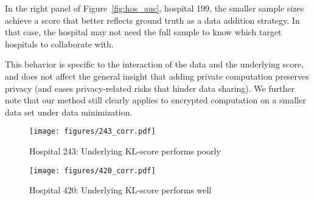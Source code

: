 In the right panel of Figure~\ref{fig:hos_auc}, hospital 199, the smaller sample sizes achieve a score that better reflects ground truth as a data addition strategy. In that case, the hospital may not need the full sample to know which target hospitals to collaborate with. 

This behavior is specific to the interaction of the data and the underlying score, and does not affect the general insight that adding private computation preserves privacy (and eases privacy-related risks that hinder data sharing). We further note that our method still clearly applies to encrypted computation on a smaller data set under data minimization.


\begin{figure}[h]
\begin{minipage}[t]{0.48\textwidth}
  \centering
  \texttt{[image: figures/243\_corr.pdf]}
  \caption{Hospital 243: Underlying KL-score performs poorly}
  \label{fig:corr_poor}
\end{minipage}
\hfill
\begin{minipage}[t]{0.48\textwidth}
  \centering
  \texttt{[image: figures/420\_corr.pdf]}
  \caption{Hospital 420: Underlying KL-score performs well}
  \label{fig:corr_good}
\end{minipage}
\end{figure}

